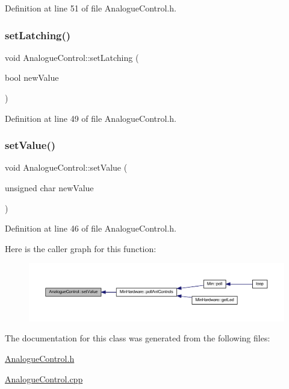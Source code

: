 Definition at line 51 of file Analogue\+Control.\+h.

\mbox{\label{class_analogue_control_af9129cb76c8fb8ea46e5fea1ea00be73}} 
\subsubsection{\texorpdfstring{set\+Latching()}{setLatching()}}
{\footnotesize\ttfamily void Analogue\+Control\+::set\+Latching (\begin{DoxyParamCaption}\item[{bool}]{new\+Value }\end{DoxyParamCaption})\hspace{0.3cm}{\ttfamily [inline]}}



Definition at line 49 of file Analogue\+Control.\+h.

\mbox{\label{class_analogue_control_a160ce73eb8eebdf131dca4dcebc44a42}} 
\subsubsection{\texorpdfstring{set\+Value()}{setValue()}}
{\footnotesize\ttfamily void Analogue\+Control\+::set\+Value (\begin{DoxyParamCaption}\item[{unsigned char}]{new\+Value }\end{DoxyParamCaption})\hspace{0.3cm}{\ttfamily [inline]}}



Definition at line 46 of file Analogue\+Control.\+h.

Here is the caller graph for this function\+:
\nopagebreak
\begin{figure}[H]
\begin{center}
\leavevmode
\includegraphics[width=350pt]{dc/daa/class_analogue_control_a160ce73eb8eebdf131dca4dcebc44a42_icgraph}
\end{center}
\end{figure}


The documentation for this class was generated from the following files\+:\begin{DoxyCompactItemize}
\item 
\hyperlink{_analogue_control_8h}{Analogue\+Control.\+h}\item 
\hyperlink{_analogue_control_8cpp}{Analogue\+Control.\+cpp}\end{DoxyCompactItemize}
